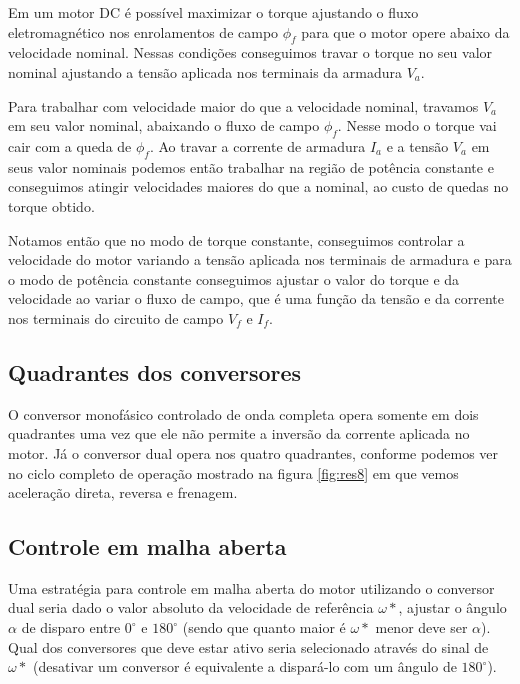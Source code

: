 \documentclass{article}
\begin{document}
Em um motor DC é possível maximizar o torque ajustando o fluxo eletromagnético nos enrolamentos de campo $\phi_f$ para que o motor opere abaixo da velocidade nominal. Nessas condições conseguimos travar o torque no seu valor nominal ajustando a tensão aplicada nos terminais da armadura $V_a$.

Para trabalhar com velocidade maior do que a velocidade nominal, travamos $V_a$ em seu valor nominal, abaixando o fluxo de campo $\phi_f$. Nesse modo o torque vai cair com a queda de $\phi_f$. Ao travar a corrente de armadura $I_a$ e a tensão $V_a$ em seus valor nominais podemos então trabalhar na região de potência constante e conseguimos atingir velocidades maiores do que a nominal, ao custo de quedas no torque obtido.

Notamos então que no modo de torque constante, conseguimos controlar a velocidade do motor variando a tensão aplicada nos terminais de armadura e para o modo de potência constante conseguimos ajustar o valor do torque e da velocidade ao variar o fluxo de campo, que é uma função da tensão e da corrente nos terminais do circuito de campo $V_f$ e $I_f$.

\subsection{Quadrantes dos conversores}
O conversor monofásico controlado de onda completa opera somente em dois quadrantes uma vez que ele não permite a inversão da corrente aplicada no motor. Já o conversor dual opera nos quatro quadrantes, conforme podemos ver no ciclo completo de operação mostrado na figura \ref{fig:res8} em que vemos aceleração direta, reversa e frenagem.

\subsection{Controle em malha aberta}
Uma estratégia para controle em malha aberta do motor utilizando o conversor dual seria dado o valor absoluto da velocidade de referência $\omega*$, ajustar o ângulo $\alpha$ de disparo entre $0^\circ$ e $180^\circ$ (sendo que quanto maior é $\omega*$ menor deve ser $\alpha$). Qual dos conversores que deve estar ativo seria selecionado através do sinal de $\omega*$ (desativar um conversor é equivalente a dispará-lo com um ângulo de $180^\circ$).

\end{document}
